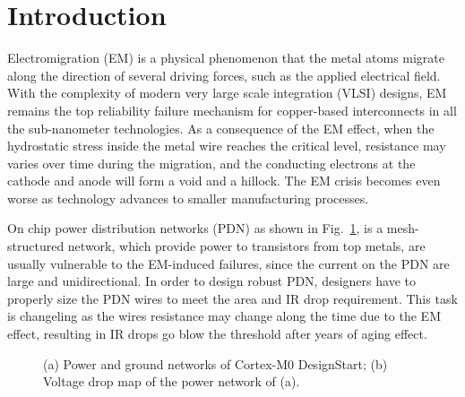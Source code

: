 \section{Introduction}
\label{sec:intro}
Electromigration (EM) is a physical phenomenon that the metal atoms migrate along the direction of several driving forces, such as the applied electrical field. 
With the complexity of modern very large scale integration (VLSI) designs, EM remains the top reliability failure mechanism for copper-based interconnects in all the sub-nanometer technologies.
As a consequence of the EM effect, when the hydrostatic stress inside the metal wire reaches the critical level, resistance may varies over time during the migration, and the conducting electrons at the cathode and anode will form a void and a hillock.
The EM crisis becomes even worse as technology advances to smaller manufacturing processes. 

On chip power distribution networks (PDN) as shown in Fig.~\ref{fig:pgimage}, is a mesh-structured network, which provide power to transistors from top metals, are usually vulnerable to the EM-induced failures, since the current on the PDN are large and unidirectional. In order to design robust PDN, designers have to properly size the PDN wires to meet the area and IR drop requirement. This task is changeling as the wires resistance may change along the time due to the EM effect, resulting in IR drops go blow the threshold after years of aging effect.

\begin{figure}[htp]
	\centering
	\caption{(a) Power and ground networks of Cortex-M0 DesignStart; (b) Voltage drop map of the power network of (a).}
	\label{fig:pgimage}
\end{figure}


